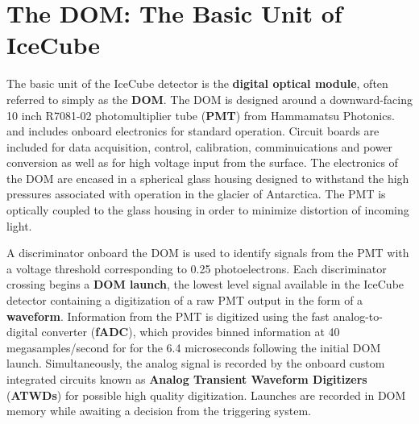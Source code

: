 \section{The DOM: The Basic Unit of IceCube}
The basic unit of the IceCube detector is the \textbf{digital optical module}, often referred to simply as the \textbf{DOM}.
The DOM is designed around a downward-facing 10 inch R7081-02 photomultiplier tube (\textbf{PMT}) from Hammamatsu Photonics.  and includes onboard electronics for standard operation. 
Circuit boards are included for data acquisition, control, calibration, comminuications and power conversion as well as for high voltage input from the surface.
The electronics of the DOM are encased in a spherical glass housing designed to withstand the high pressures associated with operation in the glacier of Antarctica.
The PMT is optically coupled to the glass housing in order to minimize distortion of incoming light. 



A discriminator onboard the DOM is used to identify signals from the PMT with a voltage threshold corresponding to 0.25 photoelectrons.
Each discriminator crossing begins a \textbf{DOM launch}, the lowest level signal available in the IceCube detector containing a digitization of a raw PMT output in the form of a \textbf{waveform}.
Information from the PMT is digitized using the fast analog-to-digital converter (\textbf{fADC}), which provides binned information at 40 megasamples/second for for the 6.4 microseconds following the initial DOM launch.
Simultaneously, the analog signal is recorded by the onboard custom integrated circuits known as \textbf{Analog Transient Waveform Digitizers} (\textbf{ATWDs}) for possible high quality digitization.
Launches are recorded in DOM memory while awaiting a decision from the triggering system.

